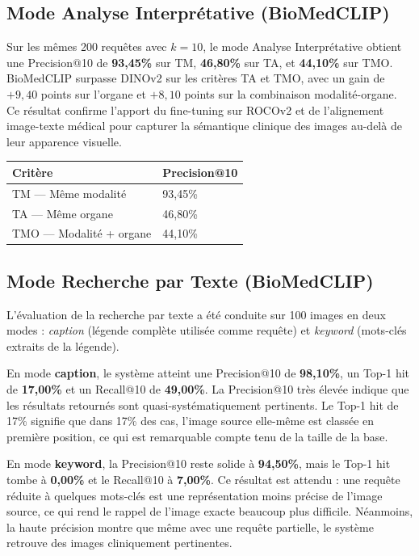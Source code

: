\documentclass[12pt,a4paper]{article}
\begin{document}
\subsection{Mode Analyse Interprétative (BioMedCLIP)}

Sur les mêmes 200 requêtes avec $k=10$, le mode Analyse Interprétative obtient
une Precision@10 de \textbf{93,45\%} sur TM, \textbf{46,80\%} sur TA, et
\textbf{44,10\%} sur TMO. BioMedCLIP surpasse DINOv2 sur les critères TA et TMO,
avec un gain de $+9,40$ points sur l'organe et $+8,10$ points sur la combinaison
modalité-organe. Ce résultat confirme l'apport du fine-tuning sur ROCOv2 et de
l'alignement image-texte médical pour capturer la sémantique clinique des images
au-delà de leur apparence visuelle.

\begin{center}
\begin{tabularx}{0.7\textwidth}{@{}lX@{}}
\toprule
\textbf{Critère} & \textbf{Precision@10} \\
\midrule
TM — Même modalité          & 93,45\% \\
TA — Même organe            & 46,80\% \\
TMO — Modalité + organe     & 44,10\% \\
\bottomrule
\end{tabularx}
\end{center}

\subsection{Mode Recherche par Texte (BioMedCLIP)}

L'évaluation de la recherche par texte a été conduite sur 100 images en deux
modes : \textit{caption} (légende complète utilisée comme requête) et
\textit{keyword} (mots-clés extraits de la légende).

En mode \textbf{caption}, le système atteint une Precision@10 de
\textbf{98,10\%}, un Top-1 hit de \textbf{17,00\%} et un Recall@10 de
\textbf{49,00\%}. La Precision@10 très élevée indique que les résultats retournés
sont quasi-systématiquement pertinents. Le Top-1 hit de 17\% signifie que dans
17\% des cas, l'image source elle-même est classée en première position, ce qui
est remarquable compte tenu de la taille de la base.

En mode \textbf{keyword}, la Precision@10 reste solide à \textbf{94,50\%}, mais
le Top-1 hit tombe à \textbf{0,00\%} et le Recall@10 à \textbf{7,00\%}. Ce
résultat est attendu : une requête réduite à quelques mots-clés est une
représentation moins précise de l'image source, ce qui rend le rappel de l'image
exacte beaucoup plus difficile. Néanmoins, la haute précision montre que même
avec une requête partielle, le système retrouve des images cliniquement
pertinentes.
\end{document}

